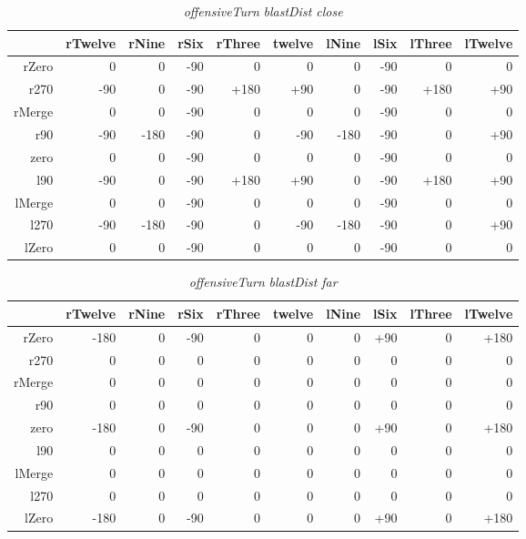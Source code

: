 \begin{table}[H]
\centering
\caption{\emph{offensiveTurn} \emph{blastDist close}}
\label{Turn rule table}
\begin{tabular}{r|r|r|r|r|r|r|r|r|r}
 		& rTwelve 	& rNine 	& rSix 		& rThree 		& twelve 	& lNine 	& lSix 		& lThree	& lTwelve		\\ \hline
rZero	& 0			& 0			& -90		& 0 		 	& 0			& 0			& -90	 	& 0			& 0				\\
r270	& -90		& 0			& -90		& +180			& +90		& 0			& -90		& +180		& +90			\\
rMerge	& 0			& 0			& -90	 	& 0				& 0			& 0			& -90		& 0			& 0				\\
r90		& -90		& -180		& -90 		& 0				& -90		& -180		& -90		& 0			& +90			\\
zero 	& 0			& 0 		& -90 		& 0				& 0			& 0			& -90		& 0			& 0				\\
l90 	& -90		& 0 		& -90		& +180			& +90		& 0			& -90		& +180		& +90			\\
lMerge	& 0			& 0 		& -90 		& 0				& 0			& 0			& -90		& 0			& 0				\\
l270 	& -90		& -180 		& -90		& 0				& -90		& -180		& -90		& 0			& +90			\\
lZero 	& 0			& 0 		& -90	 	& 0				& 0			& 0  		& -90		& 0			& 0				
\end{tabular}
\end{table}

\begin{table}[H]
\centering
\caption{\emph{offensiveTurn} \emph{blastDist far}}
\label{Turn rule table}
\begin{tabular}{r|r|r|r|r|r|r|r|r|r}
 		& rTwelve 	& rNine 	& rSix 		& rThree 	& twelve 	& lNine 	& lSix 		& lThree	& lTwelve	\\ \hline
rZero	& -180		& 0			& -90		& 0 	 	& 0			& 0			& +90		& 0			& +180		\\
r270	& 0			& 0			& 0			& 0			& 0			& 0			& 0			& 0			& 0			\\
rMerge	& 0			& 0			& 0	 		& 0			& 0			& 0			& 0			& 0			& 0			\\
r90		& 0			& 0			& 0 		& 0			& 0			& 0			& 0			& 0			& 0			\\
zero 	& -180		& 0 		& -90 		& 0			& 0			& 0			& +90		& 0			& +180		\\
l90 	& 0			& 0 		& 0			& 0			& 0			& 0			& 0			& 0			& 0			\\
lMerge	& 0			& 0 		& 0	 		& 0			& 0			& 0			& 0			& 0			& 0			\\
l270 	& 0			& 0	 		& 0 		& 0			& 0			& 0			& 0			& 0			& 0			\\
lZero 	& -180		& 0 		& -90 		& 0			& 0			& 0  		& +90		& 0			& +180		
\end{tabular}
\end{table}

